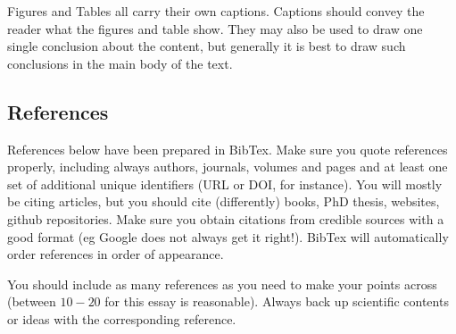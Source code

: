 \documentclass[aps,prl,twocolumn,superscriptaddress,groupedaddress]{revtex4}  %
\begin{document}
Figures and Tables all carry their own captions. Captions should convey the 
reader what the figures and table show. They may also be used to draw one 
single conclusion about the content, but generally it is best to draw such
conclusions in the main body of the text. 

\subsection{References} 

References below have been prepared in BibTex. Make sure you quote references
properly, including always authors, journals, volumes and pages and at least one 
set of additional unique identifiers (URL or DOI, for instance). You will mostly be 
citing articles, but you should cite (differently) books, PhD thesis, websites, github
repositories. Make sure you obtain citations from credible sources with a good
format (eg Google does not always get it right!). 
BibTex will automatically order references in order of appearance. 

You should include as many references as you need to make your points across 
(between $10-20$ for this essay is reasonable). Always back up scientific contents or
ideas with the corresponding reference.




\end{document}
